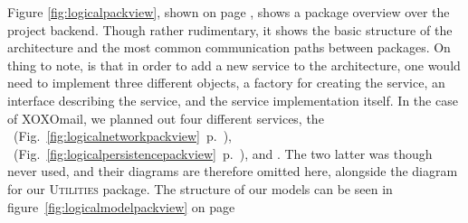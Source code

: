 Figure \ref{fig:logicalpackview}, shown on page \pageref{fig:logicalpackview}, shows a package overview over the project backend. Though rather rudimentary, it shows the basic structure of the architecture and the most common communication paths between packages. On thing to note, is that in order to add a new service to the architecture, one would need to implement three different objects, a factory for creating the service, an interface describing the service, and the service implementation itself.
\newline
\newline
In the case of XOXOmail, we planned out four different services, the ~(Fig.~\ref{fig:logicalnetworkpackview}~p.~\pageref{fig:logicalnetworkpackview}), ~(Fig.~\ref{fig:logicalpersistencepackview}~p.~\pageref{fig:logicalpersistencepackview}),  and . The two latter was though never used, and their diagrams are therefore omitted here, alongside the diagram for our \textsc{Utilities} package. The structure of our models can be seen in figure~\ref{fig:logicalmodelpackview} on page \pageref{fig:logicalmodelpackview}

